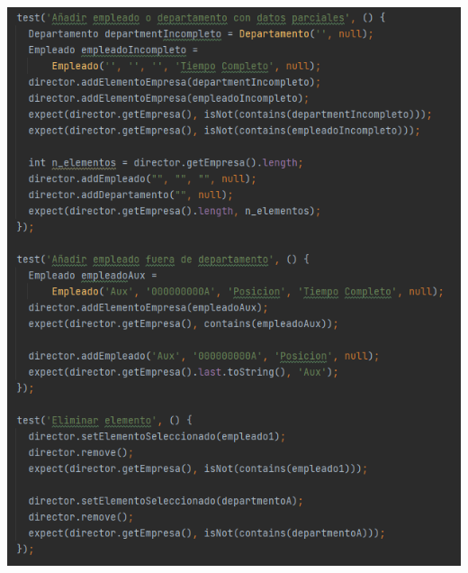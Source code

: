 \documentclass[openany]{article}
\begin{document}
\includegraphics[width=6.26772in,height=7.70833in]{imagenes/testGrupo2part2.png}
\end{document}
